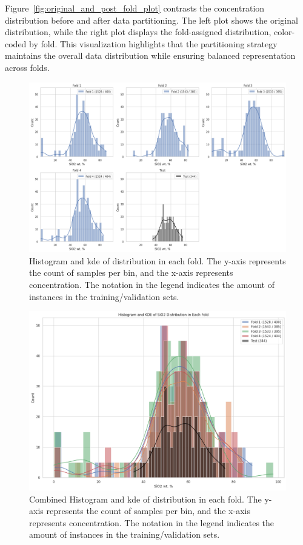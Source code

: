 Figure~\ref{fig:original_and_post_fold_plot} contrasts the  concentration distribution before and after data partitioning.
The left plot shows the original distribution, while the right plot displays the fold-assigned distribution, color-coded by fold.
This visualization highlights that the partitioning strategy maintains the overall data distribution while ensuring balanced representation across folds.

\begin{figure}
    \centering
    \includegraphics[width=\textwidth]{images/histogram_grid_plot.png}
    \caption{Histogram and \gls{kde} of  distribution in each fold. The y-axis represents the count of samples per bin, and the x-axis represents  concentration. The notation in the legend indicates the amount of instances in the training/validation sets.}
    \label{fig:histogram_grid_plot}
\end{figure}

\begin{figure}
    \centering
    \includegraphics[width=\textwidth]{images/histogram_kde_plot.png}
    \caption{Combined Histogram and \gls{kde} of  distribution in each fold. The y-axis represents the count of samples per bin, and the x-axis represents  concentration. The notation in the legend indicates the amount of instances in the training/validation sets.}
    \label{fig:histogram_kde_plot}
\end{figure}


